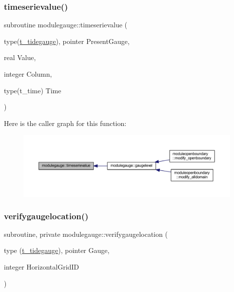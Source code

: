 \subsubsection{\texorpdfstring{timeserievalue()}{timeserievalue()}}
{\footnotesize\ttfamily subroutine modulegauge\+::timeserievalue (\begin{DoxyParamCaption}\item[{type(\mbox{\hyperlink{structmodulegauge_1_1t__tidegauge}{t\+\_\+tidegauge}}), pointer}]{Present\+Gauge,  }\item[{real}]{Value,  }\item[{integer}]{Column,  }\item[{type(t\+\_\+time)}]{Time }\end{DoxyParamCaption})\hspace{0.3cm}{\ttfamily [private]}}

Here is the caller graph for this function\+:\nopagebreak
\begin{figure}[H]
\begin{center}
\leavevmode
\includegraphics[width=350pt]{namespacemodulegauge_ae7a26f230136e4737c871ba19b1d1529_icgraph}
\end{center}
\end{figure}
\mbox{\label{namespacemodulegauge_a5143391f003e2c838204ca20768435a4}} 
\subsubsection{\texorpdfstring{verifygaugelocation()}{verifygaugelocation()}}
{\footnotesize\ttfamily subroutine, private modulegauge\+::verifygaugelocation (\begin{DoxyParamCaption}\item[{type (\mbox{\hyperlink{structmodulegauge_1_1t__tidegauge}{t\+\_\+tidegauge}}), pointer}]{Gauge,  }\item[{integer}]{Horizontal\+Grid\+ID }\end{DoxyParamCaption})\hspace{0.3cm}{\ttfamily [private]}}

